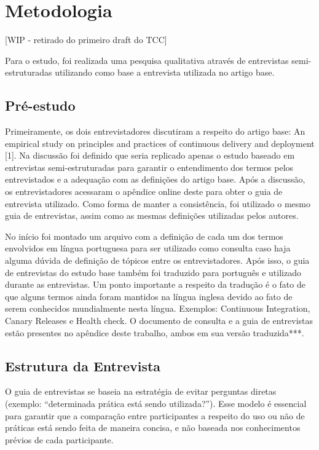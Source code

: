 
\chapter{Metodologia}
[WIP - retirado do primeiro draft do TCC]

Para o estudo, foi realizada uma pesquisa qualitativa através de entrevistas semi-estruturadas utilizando como base a entrevista utilizada no artigo base. 


\section{Pré-estudo}

Primeiramente, os dois entrevistadores discutiram a respeito do artigo base: An empirical study on principles and practices of continuous delivery and deployment [1]. Na discussão foi definido que seria replicado apenas o estudo baseado em entrevistas semi-estruturadas para garantir o entendimento dos termos pelos entrevistados e a adequação com as definições do artigo base. Após a discussão, os entrevistadores acessaram o apêndice online deste para obter o guia de entrevista utilizado. Como forma de manter a consistência, foi utilizado o mesmo guia de entrevistas, assim como as mesmas definições utilizadas pelos autores. 

No início foi montado um arquivo com a definição de cada um dos termos envolvidos em língua portuguesa para ser utilizado como consulta caso haja alguma dúvida de definição de tópicos entre os entrevistadores. Após isso, o guia de entrevistas do estudo base também foi traduzido para português e utilizado durante as entrevistas. Um ponto importante a respeito da tradução é o fato de que alguns termos ainda foram mantidos na língua inglesa devido ao fato de serem conhecidos mundialmente nesta língua. Exemplos: Continuous Integration, Canary Releases e Health check.
O documento de consulta e a guia de entrevistas estão presentes no apêndice deste trabalho, ambos em sua versão traduzida***.

\section{Estrutura da Entrevista}

O guia de entrevistas se baseia na estratégia de evitar perguntas diretas (exemplo: “determinada prática está sendo utilizada?”). Esse modelo é essencial para garantir que a comparação entre participantes a respeito do uso ou não de práticas está sendo feita de maneira concisa, e não baseada nos conhecimentos prévios de cada participante.

